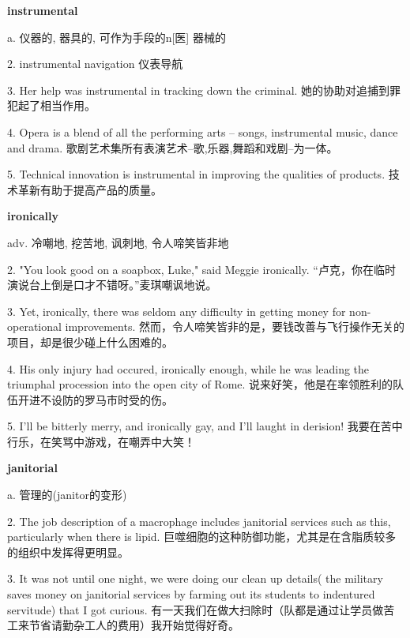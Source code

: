 \documentclass[12pt]{book}
\begin{document}
\vspace{12pt}

\textbf{instrumental}

a. 仪器的, 器具的, 可作为手段的n[医] 器械的

2.  instrumental navigation  仪表导航 


3.  Her help was instrumental in tracking down the criminal.  她的协助对追捕到罪犯起了相当作用。 


4.  Opera is a blend of all the performing arts -- songs, instrumental music, dance and drama.  歌剧艺术集所有表演艺术--歌,乐器,舞蹈和戏剧--为一体。 


5.  Technical innovation is instrumental in improving the qualities of products.  技术革新有助于提高产品的质量。 


\vspace{12pt}

\textbf{ironically}

adv. 冷嘲地, 挖苦地, 讽刺地, 令人啼笑皆非地

2.  "You look good on a soapbox, Luke," said Meggie ironically.  “卢克，你在临时演说台上倒是口才不错呀。”麦琪嘲讽地说。 


3.  Yet, ironically, there was seldom any difficulty in getting money for non-operational improvements.  然而，令人啼笑皆非的是，要钱改善与飞行操作无关的项目，却是很少碰上什么困难的。 


4.  His only injury had occured, ironically enough, while he was leading the triumphal procession into the open city of Rome.  说来好笑，他是在率领胜利的队伍开进不设防的罗马市时受的伤。 


5.  I'll be bitterly merry, and ironically gay, and I'll laught in derision!  我要在苦中行乐，在笑骂中游戏，在嘲弄中大笑！ 


\vspace{12pt}

\textbf{janitorial}

a. 管理的(janitor的变形)

2.  The job description of a macrophage includes janitorial services such as this, particularly when there is lipid.  巨噬细胞的这种防御功能，尤其是在含脂质较多的组织中发挥得更明显。 


3.  It was not until one night, we were doing our clean up details( the military saves money on janitorial services by farming out its students to indentured servitude) that I got curious.  有一天我们在做大扫除时（队都是通过让学员做苦工来节省请勤杂工人的费用）我开始觉得好奇。 
\end{document}
